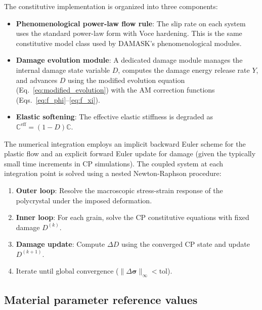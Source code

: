 \documentclass[twocolumn]{sagej}
\begin{document}
The constitutive implementation is organized into three components:

\begin{itemize}
    \item \textbf{Phenomenological power-law flow rule}: The slip rate on each system uses the standard power-law form with Voce hardening. This is the same constitutive model class used by DAMASK's phenomenological modules.

    \item \textbf{Damage evolution module}: A dedicated damage module manages the internal damage state variable $D$, computes the damage energy release rate $Y$, and advances $D$ using the modified evolution equation (Eq.~\ref{eq:modified_evolution}) with the AM correction functions (Eqs.~\ref{eq:f_phi}--\ref{eq:f_xi}).

    \item \textbf{Elastic softening}: The effective elastic stiffness is degraded as $\mathbb{C}^{\text{eff}} = (1-D)\mathbb{C}$.
\end{itemize}

The numerical integration employs an implicit backward Euler scheme for the plastic flow and an explicit forward Euler update for damage (given the typically small time increments in CP simulations). The coupled system at each integration point is solved using a nested Newton-Raphson procedure:

\begin{enumerate}\def\labelenumi{(\arabic{enumi})}
    \item \textbf{Outer loop}: Resolve the macroscopic stress-strain response of the polycrystal under the imposed deformation.
    \item \textbf{Inner loop}: For each grain, solve the CP constitutive equations with fixed damage $D^{(k)}$.
    \item \textbf{Damage update}: Compute $\Delta D$ using the converged CP state and update $D^{(k+1)}$.
    \item Iterate until global convergence ($\|\Delta\boldsymbol{\sigma}\|_\infty < \text{tol}$).
\end{enumerate}

\subsection{Material parameter reference values}
\end{document}
